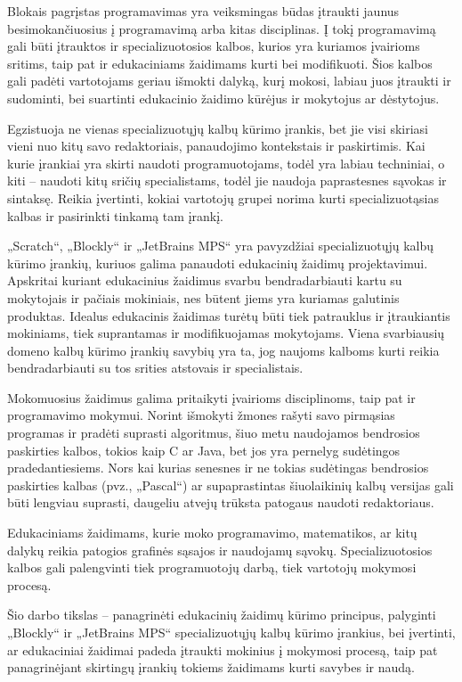 \documentclass{VUMIFPSkursinis}
\begin{document}
Blokais pagrįstas programavimas yra veiksmingas būdas įtraukti jaunus besimokančiuosius į programavimą arba kitas disciplinas. Į tokį programavimą gali būti įtrauktos ir specializuotosios kalbos, kurios yra kuriamos įvairioms sritims, taip pat ir edukaciniams žaidimams kurti bei modifikuoti. Šios kalbos gali padėti vartotojams geriau išmokti dalyką, kurį mokosi, labiau juos įtraukti ir sudominti, bei suartinti edukacinio žaidimo kūrėjus ir mokytojus ar dėstytojus.

Egzistuoja ne vienas specializuotųjų kalbų kūrimo įrankis, bet jie visi skiriasi vieni nuo kitų savo redaktoriais, panaudojimo kontekstais ir paskirtimis. Kai kurie įrankiai yra skirti naudoti programuotojams, todėl yra labiau techniniai, o kiti -- naudoti kitų sričių specialistams, todėl jie naudoja paprastesnes sąvokas ir sintaksę. Reikia įvertinti, kokiai vartotojų grupei norima kurti specializuotąsias kalbas ir pasirinkti tinkamą tam įrankį.

„Scratch“, „Blockly“ ir „JetBrains MPS“ yra pavyzdžiai specializuotųjų kalbų kūrimo įrankių, kuriuos galima panaudoti edukacinių žaidimų projektavimui. Apskritai kuriant edukacinius žaidimus svarbu bendradarbiauti kartu su mokytojais ir pačiais mokiniais, nes būtent jiems yra kuriamas galutinis produktas. Idealus edukacinis žaidimas turėtų būti tiek patrauklus ir įtraukiantis mokiniams, tiek suprantamas ir modifikuojamas mokytojams. Viena svarbiausių domeno kalbų kūrimo įrankių savybių yra ta, jog naujoms kalboms kurti reikia bendradarbiauti su tos srities atstovais ir specialistais.

Mokomuosius žaidimus galima pritaikyti įvairioms disciplinoms, taip pat ir programavimo mokymui. Norint išmokyti žmones rašyti savo pirmąsias programas ir pradėti suprasti algoritmus, šiuo metu naudojamos bendrosios paskirties kalbos, tokios kaip C ar Java, bet jos yra pernelyg sudėtingos pradedantiesiems. Nors kai kurias senesnes ir ne tokias sudėtingas bendrosios paskirties kalbas (pvz., „Pascal“) ar supaprastintas šiuolaikinių kalbų versijas gali būti lengviau suprasti, daugeliu atvejų trūksta patogaus naudoti redaktoriaus. \cite{klimevs2016domain}

Edukaciniams žaidimams, kurie moko programavimo, matematikos, ar kitų dalykų reikia patogios grafinės sąsajos ir naudojamų sąvokų. Specializuotosios kalbos gali palengvinti tiek programuotojų darbą, tiek vartotojų mokymosi procesą.

Šio darbo tikslas -- panagrinėti edukacinių žaidimų kūrimo principus, palyginti „Blockly“ ir „JetBrains MPS“ specializuotųjų kalbų kūrimo įrankius, 
bei įvertinti, ar edukaciniai žaidimai padeda įtraukti mokinius į mokymosi procesą, taip pat panagrinėjant skirtingų įrankių tokiems žaidimams kurti savybes ir naudą.  
\end{document}
